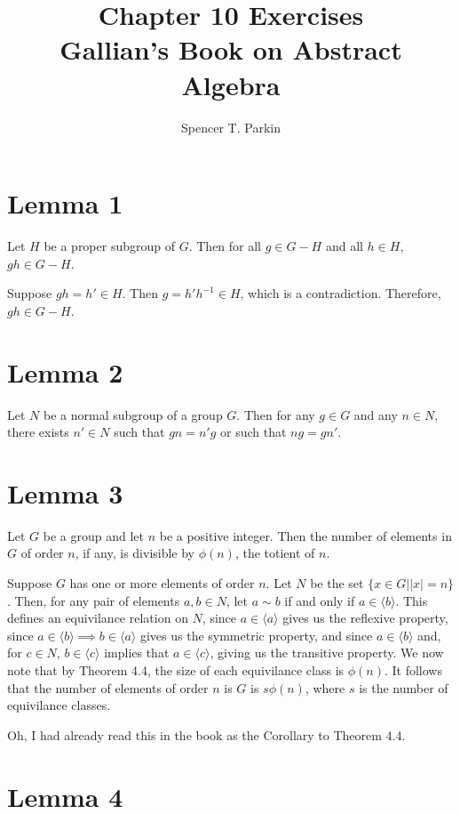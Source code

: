 \documentclass[12pt]{article}
\title{Chapter 10 Exercises\\Gallian's Book on Abstract Algebra}
\author{Spencer T. Parkin}
\begin{document}
\maketitle

\section*{Lemma 1}

Let $H$ be a proper subgroup of $G$.  Then
for all $g\in G-H$ and all $h\in H$, $gh\in G-H$.

Suppose $gh=h'\in H$.  Then $g=h'h^{-1}\in H$,
which is a contradiction.  Therefore, $gh\in G-H$.

\section*{Lemma 2}

Let $N$ be a normal subgroup of a group $G$.
Then for any $g\in G$ and any $n\in N$,
there exists $n'\in N$ such that $gn=n'g$ or such that $ng=gn'$.

\section*{Lemma 3}

Let $G$ be a group and let $n$ be a positive integer.
Then the number of elements in $G$ of order $n$, if any,
is divisible by $\phi(n)$, the totient of $n$.

Suppose $G$ has one or more elements of order $n$.
Let $N$ be the set $\{x\in G||x|=n\}$.  Then, for any pair
of elements $a,b\in N$, let $a\sim b$ if and only if $a\in\langle b\rangle$.
This defines an equivilance relation on $N$, since $a\in\langle a\rangle$ gives us
the reflexive property, since $a\in\langle b\rangle\implies b\in\langle a\rangle$ gives
us the symmetric property, and since $a\in\langle b\rangle$ and, for $c\in N$, $b\in\langle c\rangle$ implies
that $a\in\langle c\rangle$, giving us the transitive property.  We now note that
by Theorem 4.4, the size of each equivilance class is $\phi(n)$.
It follows that the number of elements of order $n$ is $G$ is
$s\phi(n)$, where $s$ is the number of equivilance classes.

Oh, I had already read this in the book as the Corollary to Theorem 4.4.

\section*{Lemma 4}
\end{document}
